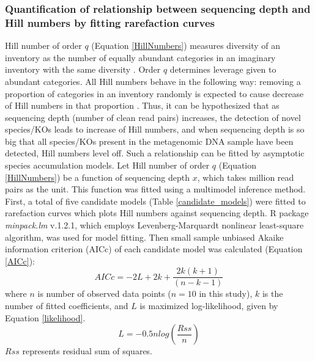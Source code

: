 \documentclass[11pt]{article}
\begin{document}
      \subsubsection{Quantification of relationship between sequencing depth and Hill numbers by fitting rarefaction curves}
      Hill number of order $q$ (Equation \ref{HillNumbers}) measures diversity of an inventory as the number of equally abundant categories in an imaginary inventory with the same diversity \citep{chao2014unifying,roswell2021conceptual}. 
      Order $q$ determines leverage given to abundant categories. 
      All Hill numbers behave in the following way: removing a proportion of categories in an inventory randomly is expected to cause decrease of Hill numbers in that proportion \citep{roswell2021conceptual}. 
      Thus, it can be hypothesized that as sequencing depth (number of clean read pairs) increases, the detection of novel species/KOs leads to increase of Hill numbers, and when sequencing depth is so big that all species/KOs present in the metagenomic DNA sample have been detected, Hill numbers level off. 
      Such a relationship can be fitted by asymptotic species accumulation models.
      \newline
      Let Hill number of order $q$ (Equation \ref{HillNumbers}) be a function of sequencing depth $x$, which takes million read pairs as the unit. 
      This function was fitted using a multimodel inference method. 
      First, a total of five candidate models (Table \ref{candidate_models}) were fitted to rarefaction curves which plots Hill numbers against sequencing depth. 
      R package \textit{minpack.lm} v.1.2.1, which employs Levenberg-Marquardt nonlinear least-square algorithm, was used for model fitting. 
      Then small sample unbiased Akaike information criterion (AICc) \citep{anderson2007model} of each candidate model was calculated (Equation \ref{AICc}):
      \begin{equation}
        AICc = -2L+2k+\frac{2k(k+1)}{(n-k-1)}
        \label{AICc}
      \end{equation}
      where $n$ is number of observed data points ($n = 10$ in this study), $k$ is the number of fitted coefficients, and $L$ is maximized log-likelihood, given by Equation \ref{likelihood}.
      \begin{equation}
        L = -0.5nlog(\frac{Rss}{n})
        \label{likelihood}
      \end{equation}
      $Rss$ represents residual sum of squares.
      \newline
\end{document}
